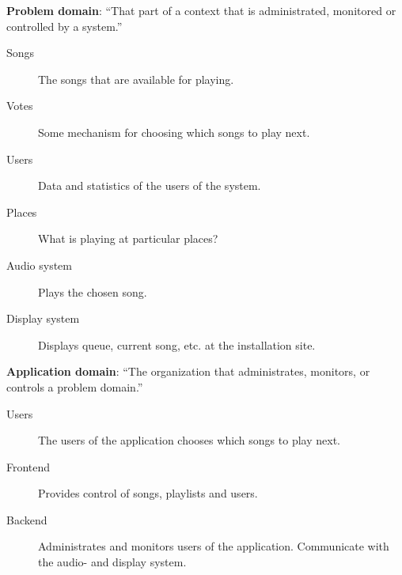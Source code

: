 
\textbf{Problem domain}: \enquote{That part of a context that is administrated, monitored or controlled by a system.}

\begin{description}
  \item[Songs] The songs that are available for playing.
  \item[Votes] Some mechanism for choosing which songs to play next.
  \item[Users] Data and statistics of the users of the system.
  \item[Places] What is playing at particular places?
  \item[Audio system] Plays the chosen song.
  \item[Display system] Displays queue, current song, etc. at the installation site.
\end{description}

\textbf{Application domain}: \enquote{The organization that administrates, monitors, or controls a problem domain.}

\begin{description}
  \item[Users] The users of the application chooses which songs to play next.
  \item[Frontend] Provides control of songs, playlists and users.
  \item[Backend] Administrates and monitors users of the application. Communicate with the audio- and display system.
\end{description}

